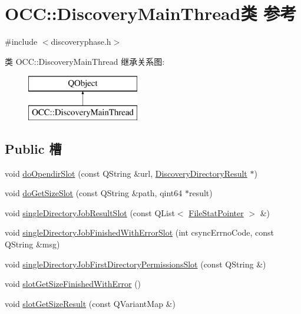 \hypertarget{class_o_c_c_1_1_discovery_main_thread}{}\section{O\+CC\+:\+:Discovery\+Main\+Thread类 参考}
\label{class_o_c_c_1_1_discovery_main_thread}


{\ttfamily \#include $<$discoveryphase.\+h$>$}

类 O\+CC\+:\+:Discovery\+Main\+Thread 继承关系图\+:\begin{figure}[H]
\begin{center}
\leavevmode
\includegraphics[height=2.000000cm]{class_o_c_c_1_1_discovery_main_thread}
\end{center}
\end{figure}
\subsection*{Public 槽}
\begin{DoxyCompactItemize}
\item 
void \hyperlink{class_o_c_c_1_1_discovery_main_thread_ac0cb5a388550715ccda35a0f2718af43}{do\+Opendir\+Slot} (const Q\+String \&url, \hyperlink{struct_o_c_c_1_1_discovery_directory_result}{Discovery\+Directory\+Result} $\ast$)
\item 
void \hyperlink{class_o_c_c_1_1_discovery_main_thread_aeed681826c83ddad1fb0201edd435dc6}{do\+Get\+Size\+Slot} (const Q\+String \&path, qint64 $\ast$result)
\item 
void \hyperlink{class_o_c_c_1_1_discovery_main_thread_aecf880cd5929be0d10372c4861a017a9}{single\+Directory\+Job\+Result\+Slot} (const Q\+List$<$ \hyperlink{class_o_c_c_1_1_file_stat_pointer}{File\+Stat\+Pointer} $>$ \&)
\item 
void \hyperlink{class_o_c_c_1_1_discovery_main_thread_aa0d2712a1f7bf9da44cfe285b0f2a402}{single\+Directory\+Job\+Finished\+With\+Error\+Slot} (int csync\+Errno\+Code, const Q\+String \&msg)
\item 
void \hyperlink{class_o_c_c_1_1_discovery_main_thread_a6aabf21d84ac1fe7f7797de81ad5e9f9}{single\+Directory\+Job\+First\+Directory\+Permissions\+Slot} (const Q\+String \&)
\item 
void \hyperlink{class_o_c_c_1_1_discovery_main_thread_adb793dd607037c320cdbba0a553b0665}{slot\+Get\+Size\+Finished\+With\+Error} ()
\item 
void \hyperlink{class_o_c_c_1_1_discovery_main_thread_aa9eab1990879dd740130b6d2eeb48cae}{slot\+Get\+Size\+Result} (const Q\+Variant\+Map \&)
\end{DoxyCompactItemize}
